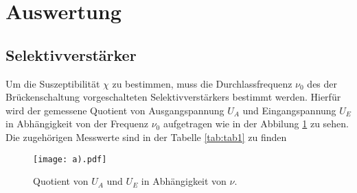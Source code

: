 \section{Auswertung}
\label{sec:Auswertung}
\subsection{Selektivverstärker}
Um die Suszeptibilität $\chi$ zu bestimmen, muss die
Durchlassfrequenz $\nu_0$ des der Brückenschaltung
vorgeschalteten Selektivverstärkers
bestimmt werden.  Hierfür wird der gemessene Quotient von Ausgangspannung $U_A$
und Eingangspannung $U_E$ in Abhängigkeit von der Frequenz $\nu_0$
aufgetragen wie in der Abbilung \ref{fig:plot1} zu sehen.
Die zugehörigen Messwerte sind in der Tabelle \ref{tab:tab1} zu finden
\begin{figure}
  \centering
  \texttt{[image: a).pdf]}
  \caption{Quotient von $U_A$ und $U_E$ in Abhängigkeit von $\nu$. }
  \label{fig:plot1}
\end{figure}

